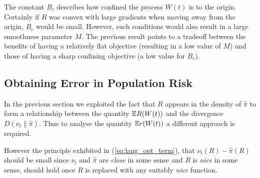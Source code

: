 \documentclass{article}
\begin{document}
The constant \(B_c\) describes how confined the process \(W(t)\) is to the origin. Certainly if \(R\) was convex with large gradients when moving away from the origin, \(B_c\) would be small. However, such conditions would also result in a large smoothness parameter \(M\). The previous result points to a tradeoff between the benefits of having a relatively flat objective (resulting in a low value of \(M\)) and those of having a sharp confining objective (a low value for \(B_c\)).

\subsection{Obtaining Error in Population Risk}
In the previous section we exploited the fact that \(R\) appears in the density of \(\hat{\pi}\) to form a relationship between the quantity \(\Bbb{E}R(W(t))\) and the divergence \(D(\nu_t \| \hat{\pi})\). Thus to analyse the quantity \(\Bbb{E}r(W(t))\) a different approach is required.

However the principle exhibited in (\ref{eq:lang_opt_term}), that \(\nu_t(R) - \hat{\pi}(R)\) should be small since \(\nu_t\) and \(\hat{\pi}\) are \textit{close} in some sense and \(R\) is \textit{nice} in some sense, should hold once \(R\) is replaced with any suitably \textit{nice} function.
\end{document}
